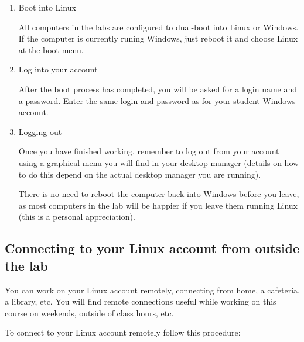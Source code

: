 \documentclass[a4paper, 12pt]{article}
\begin{document}
  \begin{enumerate}

    \item Boot into Linux

      All computers in the labs are configured to
      dual-boot into Linux or Windows. If the computer is currently runing
      Windows, just reboot it and choose Linux at the boot menu.

    \item Log into your account

      After the boot process has completed, you
      will be asked for a login name and a password. Enter the same login and
      password as for your student Windows account.

    \item Logging out

      Once you have finished working, remember to log out from
      your account using a graphical menu you will find in your desktop manager
      (details on how to do this depend on the actual desktop manager you are
      running).

      There is no need to reboot the computer back into Windows
      before you leave, as most computers in the lab will be happier if you
      leave them running Linux (this is a personal appreciation).

  \end{enumerate}

\subsection{Connecting to your Linux account from outside the lab}

  You can work on your Linux account remotely, connecting from home, a
  cafeteria, a library, etc.  You will find remote connections useful while
  working on this course on weekends, outside of class hours, etc.

  To connect to your Linux account remotely follow this procedure:
\end{document}
